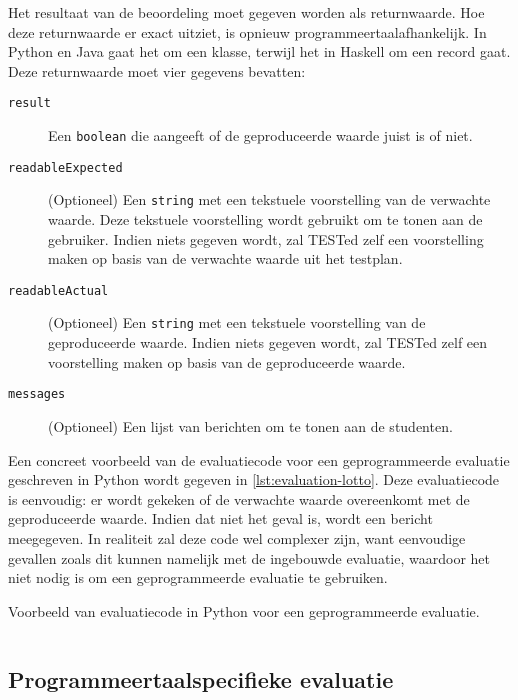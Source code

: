 Het resultaat van de beoordeling moet gegeven worden als returnwaarde.
Hoe deze returnwaarde er exact uitziet, is opnieuw programmeertaalafhankelijk.
In Python en Java gaat het om een klasse, terwijl het in Haskell om een record gaat.
Deze returnwaarde moet vier gegevens bevatten:

\begin{description}
    \item[\texttt{result}] Een \texttt{boolean} die aangeeft of de geproduceerde waarde juist is of niet.
    \item[\texttt{readableExpected}] (Optioneel) Een \texttt{string} met een tekstuele voorstelling van de verwachte waarde.
    Deze tekstuele voorstelling wordt gebruikt om te tonen aan de gebruiker.
    Indien niets gegeven wordt, zal TESTed zelf een voorstelling maken op basis van de verwachte waarde uit het testplan.
    \item[\texttt{readableActual}] (Optioneel) Een \texttt{string} met een tekstuele voorstelling van de geproduceerde waarde.
    Indien niets gegeven wordt, zal TESTed zelf een voorstelling maken op basis van de geproduceerde waarde.
    \item[\texttt{messages}] (Optioneel) Een lijst van berichten om te tonen aan de studenten.
\end{description}

Een concreet voorbeeld van de evaluatiecode voor een geprogrammeerde evaluatie geschreven in Python wordt gegeven in \cref{lst:evaluation-lotto}.
Deze evaluatiecode is eenvoudig: er wordt gekeken of de verwachte waarde overeenkomt met de geproduceerde waarde.
Indien dat niet het geval is, wordt een bericht meegegeven.
In realiteit zal deze code wel complexer zijn, want eenvoudige gevallen zoals dit kunnen namelijk met de ingebouwde evaluatie, waardoor het niet nodig is om een geprogrammeerde evaluatie te gebruiken.

\begin{listing}
    \caption{Voorbeeld van evaluatiecode in Python voor een geprogrammeerde evaluatie.}
    \label{lst:evaluation-lotto}
    \inputminted{python}{code/evaluator.py}
\end{listing}

\subsection{Programmeertaalspecifieke evaluatie}\label{subsec:programmeertaalspecifieke-evaluatie}

